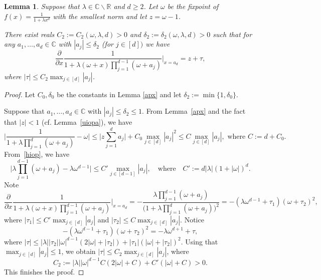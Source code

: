 \documentclass[11pt]{article}
\newtheorem{lemma}[theorem]{Lemma}
\def\Reals{\mathbb{R}}
\def\Complex{\mathbb{C}}
\begin{document}
\begin{lemma}\label{derile}
Suppose that  $\lambda\in \Complex\backslash\Reals$ and $d\geq 2$. 
Let $\omega$ be the fixpoint of $f(x)=\frac{1}{1+\lambda x^{d}}$ with the smallest norm and let $z=\omega-1$.

There exist reals $C_2:=C_2(\omega,\lambda,d)>0$ and
$\delta_2:=\delta_2(\omega,\lambda,d)>0$ such that for
any $a_1,\dots,a_{d}\in\Complex$ with $|a_j|\leq\delta_2$ (for $j\in [d])$ we have
\begin{equation}
\frac{\partial}{\partial x} \frac{1}{1+\lambda (\omega+x) \prod_{j=1}^{d-1}(\omega + a_j)} \Big |_{x=a_d}  = z + \tau,
\end{equation}
where $|\tau|\leq C_2 \max_{j\in [d]} |a_j|$.
\end{lemma}

\begin{proof}
Let $C_0,\delta_0$ be the constants in Lemma \ref{apx} and let $\delta_2:=\min\{1,\delta_0\}$. 

Suppose that $a_1,\dots,a_{d}\in\Complex$ with $|a_j|\leq\delta_2\leq 1$.  From Lemma~\ref{apx} and the fact that $|z|<1$ (cf. Lemma~\ref{uiopa}), we have 
\begin{equation}\label{csmwdz1}
\Big|\frac{1}{1+\lambda\prod_{j=1}^d (\omega+a_j)}-\omega\Big| \leq \Big| z \sum^d_{j=1} a_j\Big| + C_0 \max_{j\in [d]} |a_j|^2 \leq  C \max_{j\in [d]} |a_j|, \mbox{ where } C:=d+C_0.
\end{equation} 
 From~\eqref{hiop}, we have 
\begin{equation}\label{csmwdz2}
\Big| \lambda\prod_{j=1}^{d-1}(\omega + a_j) - \lambda \omega^{d-1}\Big | \leq  C'\max_{j\in [d-1]} |a_j|,\quad\mbox{where}\quad C':= d|\lambda| (1+|\omega|)^d.
\end{equation}
Note 
$$
\frac{\partial}{\partial x} \frac{1}{1+\lambda (\omega+x) \prod_{j=1}^{d-1}(\omega + a_j)} \Big |_{x=a_d} = - \frac{\lambda\prod_{j=1}^{d-1}(\omega + a_j)}{\Big(1+\lambda\prod_{j=1}^d (\omega+a_j)\Big)^2} 
= -  (\lambda\omega^{d-1} + \tau_1) (\omega + \tau_2)^2,
$$
where $|\tau_1|\leq C' \max_{j\in [d]} |a_j|$ and $|\tau_2|\leq C \max_{j\in [d]} |a_j|$. Notice 
$$
-  (\lambda\omega^{d-1} + \tau_1) (\omega + \tau_2)^2 = -\lambda\omega^{d+1} + \tau,
$$
where $|\tau|\leq |\lambda||\tau_2||\omega|^{d-1} (2|\omega|+ |\tau_2|)+|\tau_1|(|\omega|+|\tau_2|)^2$. Using that $\max_{j\in [d]} |a_j|\leq 1$, we obtain $|\tau|\leq C_2\max_{j\in [d]} |a_j|$, where 
\[C_2:=|\lambda||\omega|^{d-1} C(2|\omega|+ C)+C'(|\omega|+C)>0.\]
This finishes the proof.
\end{proof}
\end{document}
